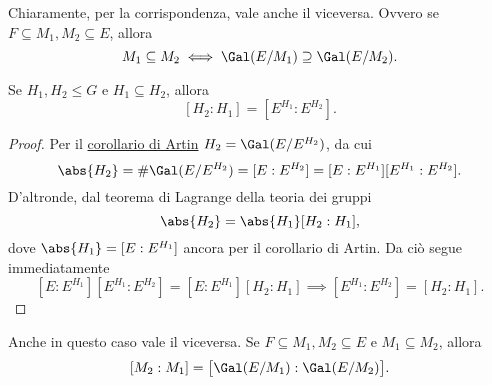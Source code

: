 \begin{oss}
	Chiaramente, per la corrispondenza, vale anche il viceversa. Ovvero se \(F\subseteq M_1,M_2 \subseteq E\), allora
	\[
		M_1 \subseteq M_2 \iff \Gal(E/M_1) \supseteq \Gal(E/M_2).
	\]
\end{oss}

\begin{pr}\label{TFCG2}
	Se \(H_1,H_2 \le G\) e \(H_1 \subseteq H_2\), allora
	\[
		[H_2:H_1] = [E^{H_1}:E^{H_2}].
	\]
\end{pr}

\begin{proof}
	Per il \hyperref[cor:Artin]{corollario di Artin} \(H_2 = \Gal(E/E^{H_2})\), da cui
	\[
		\abs{H_2} = \#\Gal(E/E^{H_2}) = [E:E^{H_2}] = [E:E^{H_1}][E^{H_1}:E^{H_2}].
	\]
	D'altronde, dal teorema di Lagrange della teoria dei gruppi
	\[
		\abs{H_2} = \abs{H_1}[H_2:H_1],
	\]
	dove \(\abs{H_1}=[E:E^{H_1}]\) ancora per il corollario di Artin. Da ciò segue immediatamente
	\[
		[E:E^{H_1}][E^{H_1}:E^{H_2}] = [E:E^{H_1}][H_2:H_1] \implies [E^{H_1}:E^{H_2}] = [H_2:H_1].
	\]
\end{proof}

\begin{oss}
	Anche in questo caso vale il viceversa. Se \(F\subseteq M_1,M_2 \subseteq E\) e \(M_1\subseteq M_2\), allora
	\[
		[M_2:M_1] = \big[\Gal(E/M_1):\Gal(E/M_2)\big].
	\]
\end{oss}

